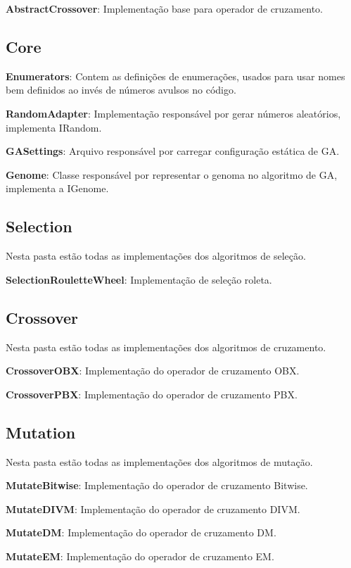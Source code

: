 \textbf{AbstractCrossover}: Implementação base para operador de cruzamento.

\subsection{Core}

\textbf{Enumerators}: Contem as definições de enumerações, usados para usar nomes bem definidos ao invés de números avulsos no código.

\textbf{RandomAdapter}: Implementação responsável por gerar números aleatórios, implementa IRandom.

\textbf{GASettings}: Arquivo responsável por carregar configuração estática de GA.

\textbf{Genome}: Classe responsável por representar o genoma no algoritmo de GA, implementa a IGenome.

\subsection{Selection}

Nesta pasta estão todas as implementações dos algoritmos de seleção.

\textbf{SelectionRouletteWheel}: Implementação de seleção roleta.

\subsection{Crossover}

Nesta pasta estão todas as implementações dos algoritmos de cruzamento.

\textbf{CrossoverOBX}: Implementação do operador de cruzamento OBX.

\textbf{CrossoverPBX}: Implementação do operador de cruzamento PBX.

\subsection{Mutation}

Nesta pasta estão todas as implementações dos algoritmos de mutação.

\textbf{MutateBitwise}: Implementação do operador de cruzamento Bitwise.

\textbf{MutateDIVM}: Implementação do operador de cruzamento DIVM.

\textbf{MutateDM}: Implementação do operador de cruzamento DM.

\textbf{MutateEM}: Implementação do operador de cruzamento EM.

